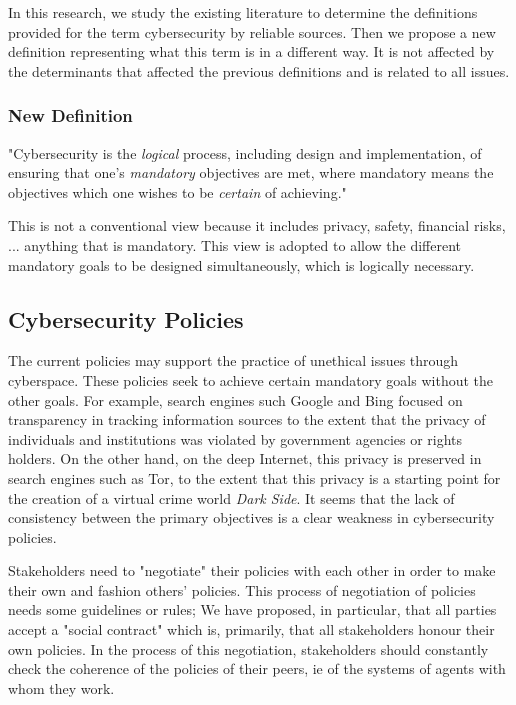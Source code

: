 In this research, we study the existing literature to determine the definitions provided for the term cybersecurity by reliable sources. Then we propose a new definition representing what this term is in a different way.  It is not affected by the determinants that affected the previous definitions and is related to all issues.
\subsubsection*{New Definition}
"Cybersecurity is the {\em logical} process, including design and implementation, of ensuring that one's {\em mandatory} objectives are met, where mandatory means the objectives which one wishes to be {\em certain} of achieving."

This is not a conventional view because it includes privacy, safety, financial risks, ...
anything that is mandatory. This view is adopted to allow the different mandatory goals
to be designed simultaneously, which is logically necessary.

\subsection{Cybersecurity Policies}
The current policies may support the practice 
of unethical issues through cyberspace.
 These policies seek to achieve certain mandatory goals without the other goals.
For example,  search engines such Google and Bing focused on transparency
in tracking information sources to the extent that the privacy of
individuals and institutions was violated by government agencies or
rights holders. On the other hand, on the deep Internet, this privacy
is preserved in search engines such as Tor, to the extent that this
privacy is a starting point for the creation of a virtual crime world
\emph{Dark Side}. It seems that the lack of consistency between the
primary objectives is a clear weakness in cybersecurity policies.

Stakeholders need to "negotiate" their policies with each other in
order to make their own and fashion others' policies. This process of
negotiation of policies needs some guidelines or rules; We have proposed,
in particular, that all parties accept a "social contract" which is,
primarily, that all stakeholders honour their own policies. In the
process of this negotiation, stakeholders should constantly check the
coherence of the policies of their peers, ie of the systems of agents
with whom they work.

